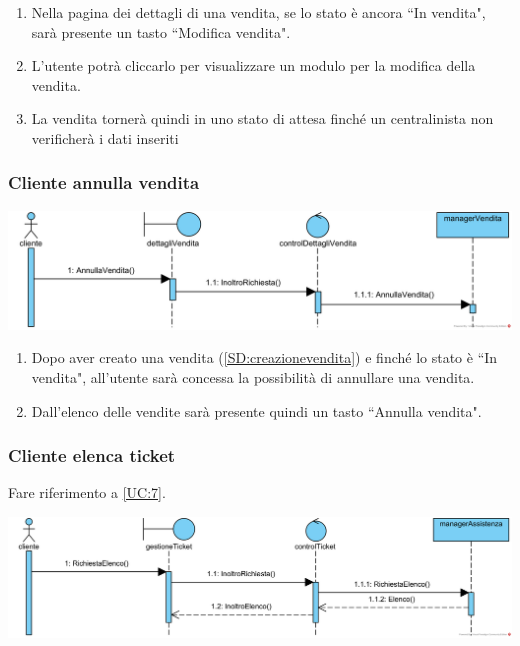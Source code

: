 \documentclass[12pt,a4paper]{article}
\begin{document}
\begin{enumerate}
\item Nella pagina dei dettagli di una vendita, se lo stato è ancora ``In vendita", sarà presente un tasto ``Modifica vendita".
\item L'utente potrà cliccarlo per visualizzare un modulo per la modifica della vendita. 
\item La vendita tornerà quindi in uno stato di attesa finché un centralinista non verificherà i dati inseriti %

\end{enumerate}

\subsubsection{Cliente annulla vendita}
\label{SD:annullavendita}

\begin{center}
\includegraphics[width=\textwidth]{SequenceDiagram/ClienteAnnullaVendita}
\end{center}

\begin{enumerate}
\item Dopo aver creato una vendita (\ref{SD:creazionevendita}) e finché lo stato è ``In vendita", all'utente sarà concessa la possibilità di annullare una vendita.
\item Dall'elenco delle vendite sarà presente quindi un tasto ``Annulla vendita".
\end{enumerate}

\newpage

\subsubsection{Cliente elenca ticket}
\label{SD:elencoticket}
Fare riferimento a \ref{UC:7}. \\

\begin{center}
\includegraphics[width=\textwidth]{SequenceDiagram/ClienteApreElencoTicket}
\end{center}
\end{document}
